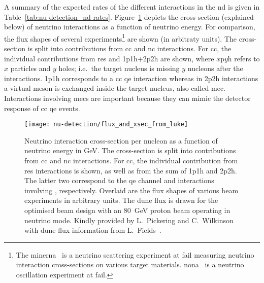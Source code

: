 A summary of the expected rates of the different interactions in the \dune{} \gls{nd} is given in Table~\ref{tab:nu-detection_nd-rates}.
Figure~\ref{fig:nu-detection_xsec_flux} depicts the cross-section (explained below) of neutrino interactions as a function of neutrino energy.
For comparison, the flux shapes of several experiments\footnote{The \acrfull{minerna}~\cite{minerna} is a neutrino scattering experiment at \acrshort{fail} measuring neutrino interaction cross-sections on various target materials. \acrfull{nona}~\cite{nona} is a neutrino oscillation experiment at \acrshort{fail}.} are shown (in arbitraty units).
The cross-section is split into contributions from \gls{cc} and \gls{nc} interactions.
For \gls{cc}, the individual contributions from \gls{res} and 1p1h+2p2h are shown, where $x$p$y$h refers to $x$ particles and $y$ holes; i.e.\ the target nucleus is missing $y$ nucleons after the interactions.
1p1h corresponds to a \gls{cc} \gls{qe} interaction whereas in 2p2h interactions a virtual meson is exchanged inside the target nucleus, also called \gls{mec}.
Interactions involving \glspl{mec} are important because they can mimic the detector response of \gls{cc} \gls{qe} events.

\begin{figure}[htb]
	\centering
	\texttt{[image: nu-detection/flux\_and\_xsec\_from\_luke]}
	\caption[Neutrino interaction cross-section and beam fluxes]{%
		Neutrino interaction cross-section per nucleon as a function of neutrino energy in \si{\giga\electronvolt}.
		The cross-section is split into contributions from \acrshort{cc} and \acrshort{nc} interactions.
		For \acrshort{cc}, the individual contribution from \acrshort{res} interactions is shown, as well as from the sum of 1p1h and 2p2h.
		The latter two correspond to the \acrshort{qe} channel and interactions involving , respectively.
		Overlaid are the flux shapes of various beam experiments in arbitrary units.
		The \acrshort{dune} flux is drawn for the optimised beam design with an \SI{80}{\giga\electronvolt} proton beam operating in neutrino mode.
		Kindly provided by L.\ Pickering and C.\ Wilkinson~\cite{xsec_luke} with \acrshort{dune} flux information from L.\ Fields~\cite{lauraNDRates}.
	}
	\label{fig:nu-detection_xsec_flux}
\end{figure}


